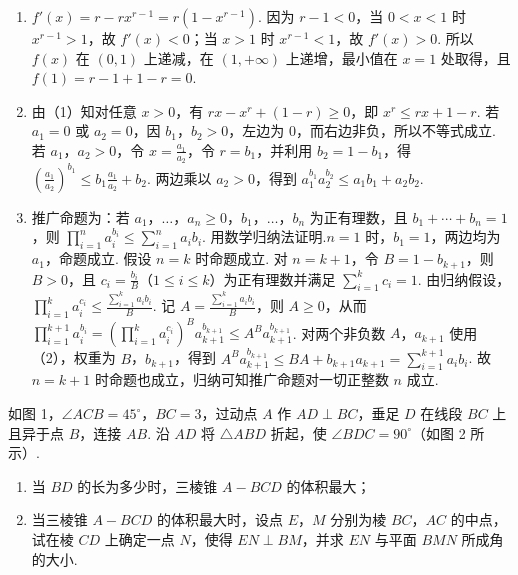 \begin{solution}
\begin{enumerate}
\item \(f'(x)=r-rx^{r-1}=r(1-x^{r-1})\). 因为 \(r-1<0\)，当 \(0<x<1\) 时 \(x^{r-1}>1\)，故 \(f'(x)<0\)；当 \(x>1\) 时 \(x^{r-1}<1\)，故 \(f'(x)>0\). 所以 \(f(x)\) 在 \((0,1)\) 上递减，在 \((1,+\infty)\) 上递增，最小值在 \(x=1\) 处取得，且 \(f(1)=r-1+1-r=0\).
\item 由（1）知对任意 \(x>0\)，有 \(rx-x^r+(1-r)\geqslant0\)，即 \(x^r\leqslant rx+1-r\). 若 \(a_1=0\) 或 \(a_2=0\)，因 \(b_1\)，\(b_2>0\)，左边为 \(0\)，而右边非负，所以不等式成立. 若 \(a_1\)，\(a_2>0\)，令 \(x=\frac{a_1}{a_2}\)，令 \(r=b_1\)，并利用 \(b_2=1-b_1\)，得 \(\left(\frac{a_1}{a_2}\right)^{b_1}\leqslant b_1\frac{a_1}{a_2}+b_2\). 两边乘以 \(a_2>0\)，得到 \(a_1^{b_1}a_2^{b_2}\leqslant a_1b_1+a_2b_2\).
\item 推广命题为：若 \(a_1\)，\(\ldots\)，\(a_n\geqslant0\)，\(b_1\)，\(\ldots\)，\(b_n\) 为正有理数，且 \(b_1+\cdots+b_n=1\)，则 \(\displaystyle\prod_{i=1}^{n}a_i^{b_i}\leqslant\sum_{i=1}^{n}a_ib_i\). 用数学归纳法证明.\(n=1\) 时，\(b_1=1\)，两边均为 \(a_1\)，命题成立. 假设 \(n=k\) 时命题成立. 对 \(n=k+1\)，令 \(B=1-b_{k+1}\)，则 \(B>0\)，且 \(c_i=\frac{b_i}{B}\)（\(1\leqslant i\leqslant k\)）为正有理数并满足 \(\sum_{i=1}^kc_i=1\). 由归纳假设，\(\displaystyle\prod_{i=1}^{k}a_i^{c_i}\leqslant\frac{\sum_{i=1}^{k}a_ib_i}{B}\). 记 \(A=\frac{\sum_{i=1}^{k}a_ib_i}{B}\)，则 \(A\geqslant0\)，从而 \(\displaystyle\prod_{i=1}^{k+1}a_i^{b_i}=\left(\prod_{i=1}^{k}a_i^{c_i}\right)^B a_{k+1}^{b_{k+1}}\leqslant A^B a_{k+1}^{b_{k+1}}\). 对两个非负数 \(A\)，\(a_{k+1}\) 使用（2），权重为 \(B\)，\(b_{k+1}\)，得到 \(A^B a_{k+1}^{b_{k+1}}\leqslant BA+b_{k+1}a_{k+1}=\sum_{i=1}^{k+1}a_ib_i\). 故 \(n=k+1\) 时命题也成立，归纳可知推广命题对一切正整数 \(n\) 成立.
\end{enumerate}
\end{solution}

\setcounter{probnum}{18}
\begin{problem}
如图 1，\(\angle ACB = 45^{\circ}\)，\(BC = 3\)，过动点 \(A\) 作 \(AD \perp BC\)，垂足 \(D\) 在线段 \(BC\) 上且异于点 \(B\)，连接 \(AB\). 沿 \(AD\) 将 \(\triangle ABD\) 折起，使 \(\angle BDC = 90^{\circ}\)（如图 2 所示）.

\begin{enumerate}
\item 当 \(BD\) 的长为多少时，三棱锥 \(A - BCD\) 的体积最大；
\item 当三棱锥 \(A - BCD\) 的体积最大时，设点 \(E\)，\(M\) 分别为棱 \(BC\)，\(AC\) 的中点，试在棱 \(CD\) 上确定一点 \(N\)，使得 \(EN \perp BM\)，并求 \(EN\) 与平面 \(BMN\) 所成角的大小.
\end{enumerate}

\end{problem}


